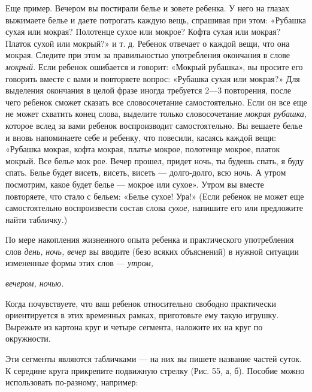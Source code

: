 \documentclass[a5paper]{book}
\renewcommand{\emph}[1]{\textit{#1}}
\begin{document}
Еще пример. Вечером вы постирали белье и зовете ребенка. У него на
глазах выжимаете белье и даете потрогать каждую вещь, спрашивая при
этом: «Рубашка сухая или мокрая? Полотенце сухое или мокрое? Кофта сухая
или мокрая? Платок сухой или мокрый?» и т. д. Ребенок отвечает о каждой
вещи, что она мокрая. Следите при этом за правильностью употребления
окончания в слове \emph{мокрый.} Если ребенок ошибается и говорит:
«Мокрый рубашка», вы просите его говорить вместе с вами и повторяете
вопрос: «Рубашка сухая или мокрая?» Для выделения окончания в целой
фразе иногда требуется 2---3 повторения, после чего ребенок сможет
сказать все словосочетание самостоятельно. Если он все еще не может
схватить конец слова, выделите только словосочетание \emph{мокрая
рубашка,} которое вслед за вами ребенок воспроизводит самостоятельно. Вы
вешаете белье и вновь напоминаете себе и ребенку, что повесили, касаясь
каждой вещи: «Рубашка мокрая, кофта мокрая, платье мокрое, полотенце
мокрое, платок мокрый. Все белье мок рое. Вечер прошел, придет ночь, ты
будешь спать, я буду спать. Белье будет висеть, висеть, висеть ---
долго-долго, всю ночь. А утром посмотрим, какое будет белье --- мокрое
или сухое». Утром вы вместе повторяете, что стало с бельем: «Белье
сухое! Ура!» (Если ребенок не может еще самостоятельно воспроизвести
состав слова \emph{сухое,} напишите его или предложите найти табличку.)



По мере накопления жизненного опыта ребенка и практического употребления
слов \emph{день,} \emph{ночь, вечер} вы вводите (безо всяких объяснений)
в нужной ситуации измененные формы этих слов --- \emph{утром,}

\emph{вечером, ночью.}

Когда почувствуете, что ваш ребенок относительно свободно практически
ориентируется в этих временных рамках, приготовьте ему такую игрушку.
Вырежьте из картона круг и четыре сегмента, наложите их на круг по
окружности.

Эти сегменты являются табличками --- на них вы пишете название частей
суток. К середине круга прикрепите подвижную стрелку (Рис. 55, а, б).
Пособие можно использовать по-разному, например:
\end{document}
